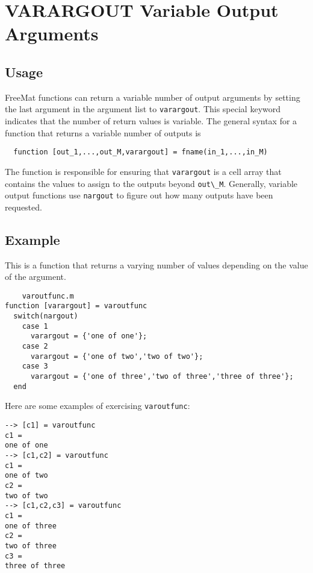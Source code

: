 \section{VARARGOUT Variable Output Arguments}

\subsection{Usage}

FreeMat functions can return a variable number of output arguments
by setting the last argument in the argument list to \verb|varargout|.
This special keyword indicates that the number of return values
is variable.  The general syntax for a function that returns
a variable number of outputs is
\begin{verbatim}
  function [out_1,...,out_M,varargout] = fname(in_1,...,in_M)
\end{verbatim}
The function is responsible for ensuring that \verb|varargout| is
a cell array that contains the values to assign to the outputs
beyond \verb|out\_M|.  Generally, variable output functions use
\verb|nargout| to figure out how many outputs have been requested.
\subsection{Example}

This is a function that returns a varying number of values
depending on the value of the argument.
\begin{verbatim}
    varoutfunc.m
function [varargout] = varoutfunc
  switch(nargout)
    case 1
      varargout = {'one of one'};
    case 2
      varargout = {'one of two','two of two'};
    case 3
      varargout = {'one of three','two of three','three of three'};
  end
\end{verbatim}
Here are some examples of exercising \verb|varoutfunc|:
\begin{verbatim}
--> [c1] = varoutfunc
c1 = 
one of one
--> [c1,c2] = varoutfunc
c1 = 
one of two
c2 = 
two of two
--> [c1,c2,c3] = varoutfunc
c1 = 
one of three
c2 = 
two of three
c3 = 
three of three
\end{verbatim}
